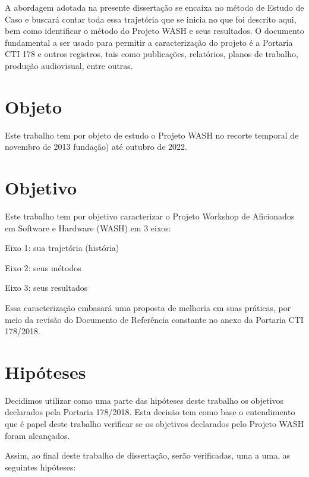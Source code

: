 \documentclass[
12pt,		%
openright,	%
twoside,  %
a4paper,			%
chapter=TITLE,		%
english,			%
french,				%
spanish,			%
brazil				%
]{USPSC-classe/USPSC}
\begin{document}
A abordagem adotada na presente disserta\c{c}\~ao se encaixa no m\'etodo de \textquotedbl Estudo de Caso e buscar\'a contar toda essa trajet\'oria que se inicia no que foi descrito aqui, bem como identificar o m\'etodo do Projeto WASH e seus resultados. O documento fundamental a ser usado para permitir a caracteriza\c{c}\~ao do projeto \'e a Portaria CTI 178 e outros registros, tais como publica\c{c}\~oes, relat\'orios, planos de trabalho, produ\c{c}\~ao audiovisual, entre outras.


\section[Objeto]{Objeto}\label{Objeto}
Este trabalho tem por objeto de estudo o  Projeto WASH no recorte temporal de novembro de 2013  funda\c{c}\~ao) at\'e outubro de 2022.


\section[Objetivo]{Objetivo}\label{Objetivo}
Este trabalho tem por objetivo caracterizar o Projeto Workshop de Aficionados em Software e Hardware (WASH) em 3 eixos:



\begin{alineas}
\item Eixo 1: sua trajet\'oria (hist\'oria)
\item Eixo 2: seus m\'etodos
\item Eixo 3: seus resultados
\end{alineas}

Essa caracteriza\c{c}\~ao embasar\'a uma proposta de melhoria em suas pr\'aticas, por meio da revis\~ao do Documento de Refer\^encia constante no anexo da Portaria CTI 178/2018.


\section[Hip\'oteses]{Hip\'oteses}\label{Hip\'oteses}
Decidimos utilizar como uma parte das hip\'oteses deste trabalho os objetivos declarados pela Portaria 178/2018. Esta decis\~ao tem como base o entendimento que \'e papel deste trabalho verificar se os objetivos declarados pelo Projeto WASH foram alcan\c{c}ados.


Assim, ao final deste trabalho de disserta\c{c}\~ao, ser\~ao verificadas, uma a uma, as seguintes hip\'oteses:
\end{document}
